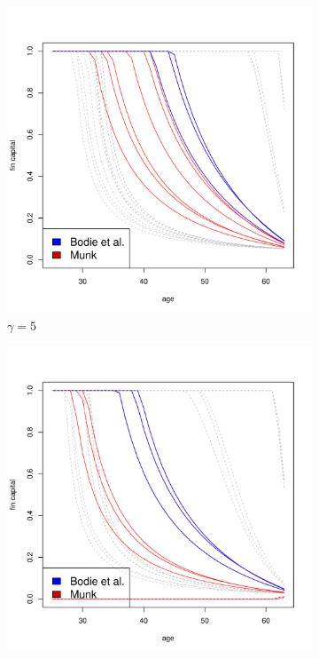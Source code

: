 \begin{figure}[H]\ContinuedFloat
    \begin{subfigure}{0.45\textwidth}
		\centering
		\includegraphics[scale=0.3]{figs/individuals5.pdf}
		\caption{$\gamma = 5$}
	\end{subfigure}
	\hfill
    \begin{subfigure}{0.45\textwidth}
		\centering
		\includegraphics[scale=0.3]{figs/individuals10.pdf}

\end{subfigure}
\end{figure}
